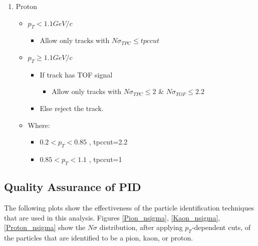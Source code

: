 \documentclass[ALICE,manyauthors]{ALICE_analysis_notes}
\begin{document}
\begin{enumerate}
\begin{itemize}[label=@]
	\end{itemize}
	\item Proton
	\begin{itemize}[label=@]
		\item $p_T<1.1GeV/c$
		\begin{itemize}[label=$\bullet$]
			\item Allow only tracks with $N\sigma_{TPC} \leq tpccut$
		\end{itemize}
		\item $p_T\geq 1.1GeV/c$
		\begin{itemize}[label=$\bullet$]
			\item If track has TOF signal
			\begin{itemize}[label=$\star$]
				\item Allow  only tracks with $N\sigma_{TPC} \leq 2$ \& $N\sigma_{TOF}\leq 2.2$
			\end{itemize}
			\item Else reject the track.
		\end{itemize}
		\item Where:	
		\begin{itemize}[label=]
			\item $0.2<p_T<0.85$ , tpccut=2.2
			\item $0.85<p_T<1.1$ , tpccut=1
		\end{itemize}
	\end{itemize}
\end{enumerate}
\subsection{Quality Assurance of PID}
The following plots show the effectiveness of the particle identification techniques that are used in this analysis. Figures \ref{Pion_nsigma}, \ref{Kaon_nsigma}, \ref{Proton_nsigma} show the $N\sigma$ distribution, after applying $p_{T}$-dependent cuts, of the particles that are identified to be a pion, kaon, or proton. 
\end{document}

